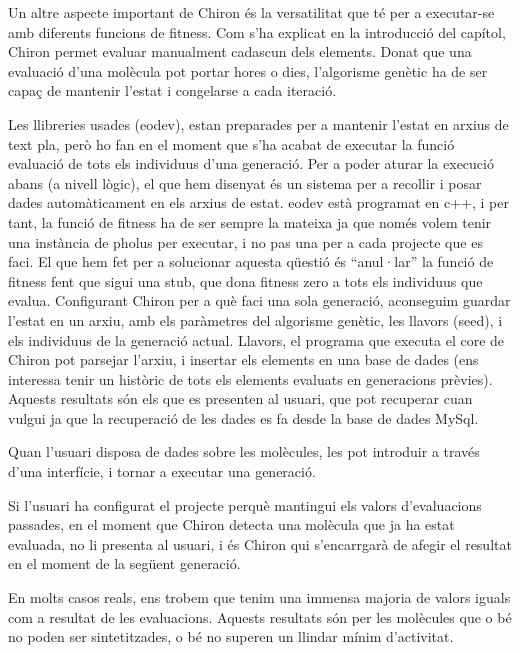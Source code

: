 \documentclass[titlepage,a4paper,12pt]{book}
\begin{document}
Un altre aspecte important de Chiron és la versatilitat que té per a executar-se
amb diferents funcions de fitness.  Com s'ha explicat en la introducció del
capítol, Chiron permet evaluar manualment cadascun dels elements.  Donat que una
evaluació d'una molècula pot portar hores o dies, l'algorisme genètic ha de ser
capaç de mantenir l'estat i congelarse a cada iteració.

Les llibreries usades (eodev), estan preparades per a mantenir l'estat en arxius
de text pla, però ho fan en el moment que s'ha acabat de executar la funció
evaluació de tots els individuus d'una generació.  Per a poder aturar la
execució abans (a nivell lògic), el que hem disenyat és un sistema per a
recollir i posar dades automàticament en els arxius de estat.  eodev està
programat en c++, i per tant, la funció de fitness ha de ser sempre la mateixa
ja que només volem tenir una instància de pholus per executar, i no pas una per
a cada projecte que es faci.  El que hem fet per a solucionar aquesta qüestió és
``anul·lar'' la funció de fitness fent que sigui una stub, que dona fitness zero
a tots els individuus que evalua.  Configurant Chiron per a què faci una sola
generació, aconseguim guardar l'estat en un arxiu, amb els paràmetres del
algorisme genètic, les llavors (seed), i els individuus de la generació actual.
Llavors, el programa que executa el core de Chiron pot parsejar l'arxiu, i
insertar els elements en una base de dades (ens interessa tenir un històric de
tots els elements evaluats en generacions prèvies).  Aquests resultats són els
que es presenten al usuari, que pot recuperar cuan vulgui ja que la recuperació
de les dades es fa desde la base de dades MySql.

Quan l'usuari disposa de dades sobre les molècules, les pot introduir a través
d'una interfície, i tornar a executar una generació.

Si l'usuari ha configurat el projecte perquè mantingui els valors d'evaluacions
passades, en el moment que Chiron detecta una molècula que ja ha estat evaluada,
no li presenta al usuari, i és Chiron qui s'encarrgarà de afegir el resultat en
el moment de la següent generació.


En  molts casos reals, ens trobem que tenim una immensa majoria de valors iguals
com a resultat de les evaluacions.  Aquests resultats són per les molècules que
o bé no poden ser sintetitzades, o bé no superen un llindar mínim d'activitat.
\end{document}

